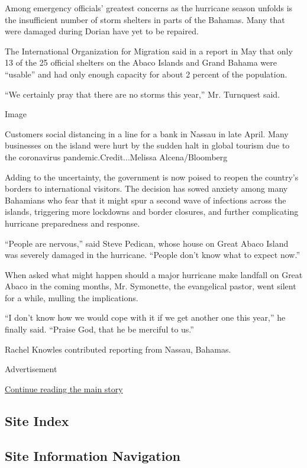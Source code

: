 Among emergency officials' greatest concerns as the hurricane season
unfolds is the insufficient number of storm shelters in parts of the
Bahamas. Many that were damaged during Dorian have yet to be repaired.

The International Organization for Migration said in a report in May
that only 13 of the 25 official shelters on the Abaco Islands and Grand
Bahama were ``usable'' and had only enough capacity for about 2 percent
of the population.

``We certainly pray that there are no storms this year,'' Mr. Turnquest
said.

Image

Customers social distancing in a line for a bank in Nassau in late
April. Many businesses on the island were hurt by the sudden halt in
global tourism due to the coronavirus pandemic.Credit...Melissa
Alcena/Bloomberg

Adding to the uncertainty, the government is now poised to reopen the
country's borders to international visitors. The decision has sowed
anxiety among many Bahamians who fear that it might spur a second wave
of infections across the islands, triggering more lockdowns and border
closures, and further complicating hurricane preparedness and response.

``People are nervous,'' said Steve Pedican, whose house on Great Abaco
Island was severely damaged in the hurricane. ``People don't know what
to expect now.''

When asked what might happen should a major hurricane make landfall on
Great Abaco in the coming months, Mr. Symonette, the evangelical pastor,
went silent for a while, mulling the implications.

``I don't know how we would cope with it if we get another one this
year,'' he finally said. ``Praise God, that he be merciful to us.''

Rachel Knowles contributed reporting from Nassau, Bahamas.

Advertisement

\protect\hyperlink{after-bottom}{Continue reading the main story}

\hypertarget{site-index}{%
\subsection{Site Index}\label{site-index}}

\hypertarget{site-information-navigation}{%
\subsection{Site Information
Navigation}\label{site-information-navigation}}

